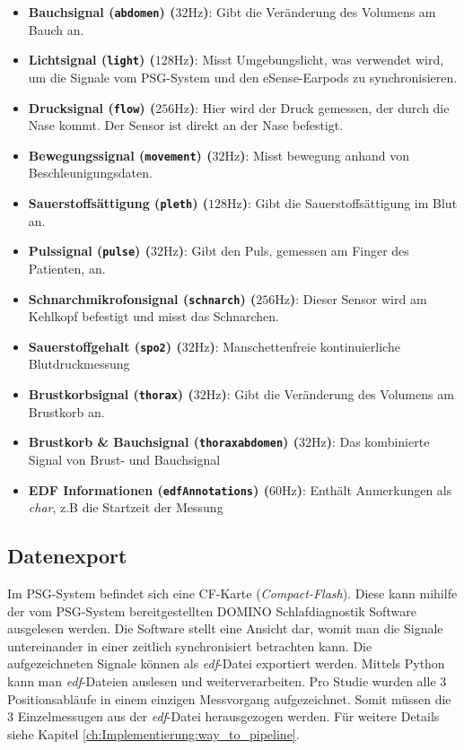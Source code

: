 \begin{itemize}
    \item \textbf{Bauchsignal (\texttt{abdomen}) ($32 \si{\hertz}$)}: Gibt die Veränderung des Volumens am Bauch an.
    \item \textbf{Lichtsignal (\texttt{light}) ($128 \si{\hertz}$)}: Misst Umgebungslicht, was verwendet wird, um die Signale vom PSG-System und den eSense-Earpods zu synchronisieren.
    \item \textbf{Drucksignal (\texttt{flow}) ($256 \si{\hertz}$)}: Hier wird der Druck gemessen, der durch die Nase kommt. Der Sensor ist direkt an der Nase befestigt.
    \item \textbf{Bewegungssignal (\texttt{movement}) ($32 \si{\hertz}$)}: Misst bewegung anhand von Beschleunigungsdaten.
    \item \textbf{Sauerstoffsättigung (\texttt{pleth}) ($128 \si{\hertz}$)}: Gibt die Sauerstoffsättigung im Blut an.
    \item \textbf{Pulssignal (\texttt{pulse}) ($32 \si{\hertz}$)}: Gibt den Puls, gemessen am Finger des Patienten, an.
    \item \textbf{Schnarchmikrofonsignal (\texttt{schnarch}) ($256 \si{\hertz}$)}: Dieser Sensor wird am Kehlkopf befestigt und misst das Schnarchen.
    \item \textbf{Sauerstoffgehalt (\texttt{spo2}) ($32 \si{\hertz}$)}: Manschettenfreie kontinuierliche Blutdruckmessung
    \item \textbf{Brustkorbsignal (\texttt{thorax}) ($32 \si{\hertz}$)}: Gibt die Veränderung des Volumens am Brustkorb an.
    \item \textbf{Brustkorb \& Bauchsignal (\texttt{thoraxabdomen}) ($32 \si{\hertz}$)}: Das kombinierte Signal von Brust- und Bauchsignal
    \item \textbf{EDF Informationen (\texttt{edfAnnotations}) ($60 \si{\hertz}$)}: Enthält Anmerkungen als \textit{char}, z.B die Startzeit der Messung
\end{itemize}

\subsection{Datenexport}
\label{ch:sa:psg:export}

Im PSG-System befindet sich eine CF-Karte (\textit{Compact-Flash}). Diese kann mihilfe der vom PSG-System bereitgestellten {\glqq DOMINO Schlafdiagnostik\grqq} Software ausgelesen werden.
Die Software stellt eine Ansicht dar, womit man die Signale untereinander in einer zeitlich synchronisiert betrachten kann. Die aufgezeichneten Signale können als \textit{edf}-Datei exportiert werden.
Mittels Python kann man \textit{edf}-Dateien auslesen und weiterverarbeiten.
Pro Studie wurden alle 3 Positionsabläufe in einem einzigen Messvorgang aufgezeichnet. Somit müssen die 3 Einzelmessugen aus der \textit{edf}-Datei herausgezogen werden.
Für weitere Details siehe Kapitel \ref{ch:Implementierung:way_to_pipeline}.

